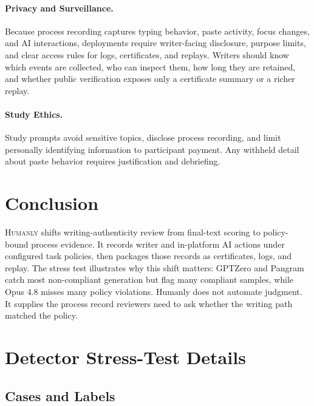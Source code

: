 \documentclass[11pt]{article}
\begin{document}
\paragraph{Privacy and Surveillance.}
Because process recording captures typing behavior, paste activity, focus changes, and AI interactions, deployments require writer-facing disclosure, purpose limits, and clear access rules for logs, certificates, and replays. Writers should know which events are collected, who can inspect them, how long they are retained, and whether public verification exposes only a certificate summary or a richer replay.

\paragraph{Study Ethics.}
Study prompts avoid sensitive topics, disclose process recording, and limit personally identifying information to participant payment. Any withheld detail about paste behavior requires justification and debriefing.

\section{Conclusion}
\label{sec:conclusion}

\textsc{Humanly} shifts writing-authenticity review from final-text scoring to policy-bound process evidence. It records writer and in-platform AI actions under configured task policies, then packages those records as certificates, logs, and replay. The stress test illustrates why this shift matters: GPTZero and Pangram catch most non-compliant generation but flag many compliant samples, while Opus 4.8 misses many policy violations. Humanly does not automate judgment. It supplies the process record reviewers need to ask whether the writing path matched the policy.

%


\appendix
\section{Detector Stress-Test Details}
\label{sec:appendix-detector-metrics}

\subsection{Cases and Labels}
\end{document}
